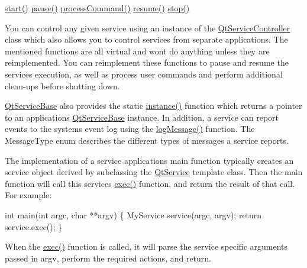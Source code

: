 \hyperlink{class_qt_service_base_adbc0cd621b41bd3a6a1f62fda432e9e4}{start()}  \hyperlink{class_qt_service_base_a43215a7c5c047d30bcf4f697e6691f89}{pause()}  \hyperlink{class_qt_service_base_a47485f00f6eba0758d2ffc75092295cf}{process\+Command()}  \hyperlink{class_qt_service_base_aaa2e05ef1c36283b6b35348c3972b489}{resume()}  \hyperlink{class_qt_service_base_a8d52c1b8fd06b50bdc0a0c6f9936a68e}{stop()} 

You can control any given service using an instance of the \hyperlink{class_qt_service_controller}{Qt\+Service\+Controller} class which also allows you to control services from separate applications. The mentioned functions are all virtual and won\textquotesingle{}t do anything unless they are reimplemented. You can reimplement these functions to pause and resume the service\textquotesingle{}s execution, as well as process user commands and perform additional clean-\/ups before shutting down.

\hyperlink{class_qt_service_base}{Qt\+Service\+Base} also provides the static \hyperlink{class_qt_service_base_a8f030376e32cc47736bfc1a1e1ecf855}{instance()} function which returns a pointer to an application\textquotesingle{}s \hyperlink{class_qt_service_base}{Qt\+Service\+Base} instance. In addition, a service can report events to the system\textquotesingle{}s event log using the \hyperlink{class_qt_service_base_ac071ce0b30547e17c3b3ca9dcb0108c9}{log\+Message()} function. The Message\+Type enum describes the different types of messages a service reports.

The implementation of a service application\textquotesingle{}s main function typically creates an service object derived by subclassing the \hyperlink{class_qt_service}{Qt\+Service} template class. Then the main function will call this service\textquotesingle{}s \hyperlink{class_qt_service_base_afae2e589de71c1ae3ae8db3dc9ab9c64}{exec()} function, and return the result of that call. For example\+:


\begin{DoxyCode}
\textcolor{keywordtype}{int} main(\textcolor{keywordtype}{int} argc, \textcolor{keywordtype}{char} **argv)
\{
    MyService service(argc, argv);
    \textcolor{keywordflow}{return} service.exec();
\}
\end{DoxyCode}


When the \hyperlink{class_qt_service_base_afae2e589de71c1ae3ae8db3dc9ab9c64}{exec()} function is called, it will parse the service specific arguments passed in {\ttfamily argv}, perform the required actions, and return.

